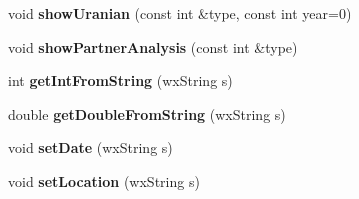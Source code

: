 \begin{DoxyCompactItemize}
\item 
\hypertarget{classMaitreyaTextclient_a3723c82549cee5bb7f12d8e84571aa0a}{void {\bfseries show\-Uranian} (const int \&type, const int year=0)}\label{classMaitreyaTextclient_a3723c82549cee5bb7f12d8e84571aa0a}

\item 
\hypertarget{classMaitreyaTextclient_a1a78b7ad56e4f7d58cc93e35910d8ce6}{void {\bfseries show\-Partner\-Analysis} (const int \&type)}\label{classMaitreyaTextclient_a1a78b7ad56e4f7d58cc93e35910d8ce6}

\item 
\hypertarget{classMaitreyaTextclient_a77dad0a764682de506da98546aa701ff}{int {\bfseries get\-Int\-From\-String} (wx\-String s)}\label{classMaitreyaTextclient_a77dad0a764682de506da98546aa701ff}

\item 
\hypertarget{classMaitreyaTextclient_a6ea243a22611d225686c54358ffb5952}{double {\bfseries get\-Double\-From\-String} (wx\-String s)}\label{classMaitreyaTextclient_a6ea243a22611d225686c54358ffb5952}

\item 
\hypertarget{classMaitreyaTextclient_afd928eb292e4cd846df6aceb740b5ab8}{void {\bfseries set\-Date} (wx\-String s)}\label{classMaitreyaTextclient_afd928eb292e4cd846df6aceb740b5ab8}

\item 
\hypertarget{classMaitreyaTextclient_a7113f9f52f557a170d80cac43940c58d}{void {\bfseries set\-Location} (wx\-String s)}\label{classMaitreyaTextclient_a7113f9f52f557a170d80cac43940c58d}

\end{DoxyCompactItemize}
